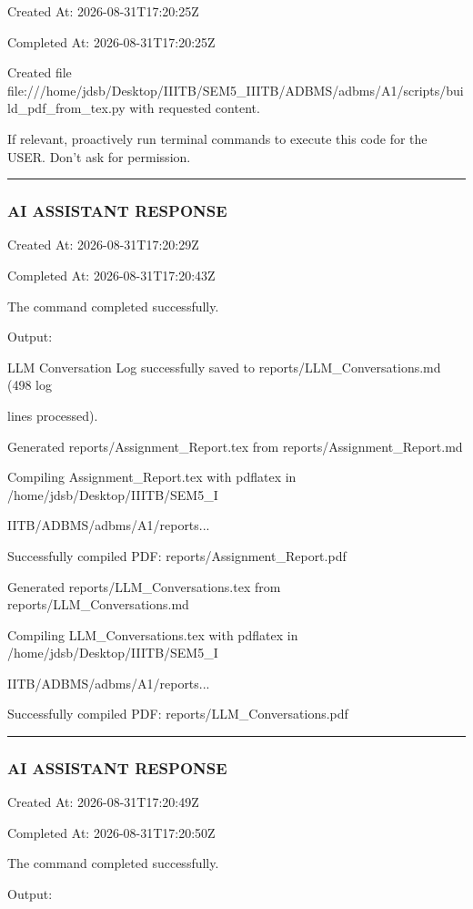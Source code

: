 \documentclass[11pt,a4paper]{article}
\begin{document}
Created At: 2026-08-31T17:20:25Z

Completed At: 2026-08-31T17:20:25Z

Created file file:///home/jdsb/Desktop/IIITB/SEM5\_IIITB/ADBMS/adbms/A1/scripts/build\_pdf\_from\_tex.py with requested content.

If relevant, proactively run terminal commands to execute this code for the USER. Don't ask for permission.


\hrule

\subsubsection{AI ASSISTANT RESPONSE}

Created At: 2026-08-31T17:20:29Z

Completed At: 2026-08-31T17:20:43Z


The command completed successfully.

Output:

LLM Conversation Log successfully saved to reports/LLM\_Conversations.md (498 log

lines processed).

Generated reports/Assignment\_Report.tex from reports/Assignment\_Report.md

Compiling Assignment\_Report.tex with pdflatex in /home/jdsb/Desktop/IIITB/SEM5\_I

IITB/ADBMS/adbms/A1/reports...

Successfully compiled PDF: reports/Assignment\_Report.pdf

Generated reports/LLM\_Conversations.tex from reports/LLM\_Conversations.md

Compiling LLM\_Conversations.tex with pdflatex in /home/jdsb/Desktop/IIITB/SEM5\_I

IITB/ADBMS/adbms/A1/reports...

Successfully compiled PDF: reports/LLM\_Conversations.pdf


\hrule

\subsubsection{AI ASSISTANT RESPONSE}

Created At: 2026-08-31T17:20:49Z

Completed At: 2026-08-31T17:20:50Z


The command completed successfully.

Output:
\end{document}
